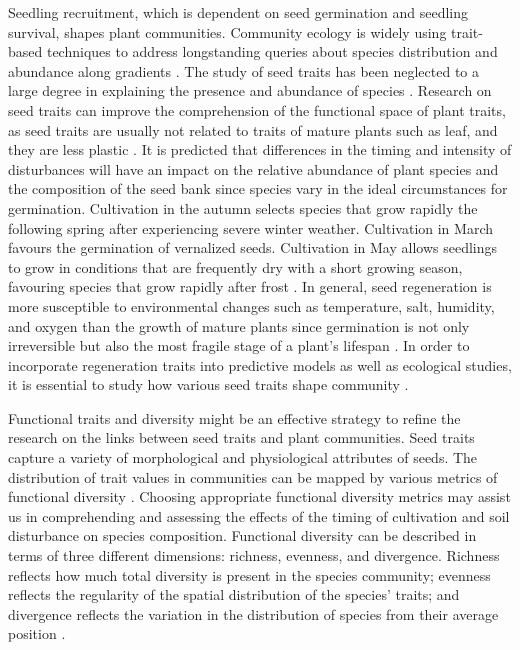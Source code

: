 \documentclass[a4paper, 11, margin=2cm]{article}
\begin{document}
    Seedling recruitment, which is dependent on seed germination and seedling survival, shapes plant communities. Community ecology is widely using trait-based techniques to address longstanding queries about species distribution and abundance along gradients \citep{zirbel2020trait}. The study of seed traits has been neglected to a large degree in explaining the presence and abundance of species \citep{rosbakh2022inferring}. Research on seed traits can improve the comprehension of the functional space of plant traits, as seed traits are usually not related to traits of mature plants such as leaf, and they are less plastic \citep{jimenez2016seed}. It is predicted that differences in the timing and intensity of disturbances will have an impact on the relative abundance of plant species and the composition of the seed bank since species vary in the ideal circumstances for germination. Cultivation in the autumn selects species that grow rapidly the following spring after experiencing severe winter weather. Cultivation in March favours the germination of vernalized seeds. Cultivation in May allows seedlings to grow in conditions that are frequently dry with a short growing season, favouring species that grow rapidly after frost \citep{crawley2004timing}. In general, seed regeneration is more susceptible to environmental changes such as temperature, salt, humidity, and oxygen than the growth of mature plants since germination is not only irreversible but also the most fragile stage of a plant's lifespan \citep{jimenez2016seed}. In order to incorporate regeneration traits into predictive models as well as ecological studies, it is essential to study how various seed traits shape community \citep{saatkamp2019research}.

    Functional traits and diversity might be an effective strategy to refine the research on the links between seed traits and plant communities. Seed traits capture a variety of morphological and physiological attributes of seeds. The distribution of trait values in communities can be mapped by various metrics of functional diversity \citep{lavorel2008assessing}. Choosing appropriate functional diversity metrics may assist us in comprehending and assessing the effects of the timing of cultivation and soil disturbance on species composition. Functional diversity can be described in terms of three different dimensions: richness, evenness, and divergence. Richness reflects how much total diversity is present in the species community; evenness reflects the regularity of the spatial distribution of the species' traits; and divergence reflects the variation in the distribution of species from their average position \citep{mammola2021concepts}.
\end{document}
